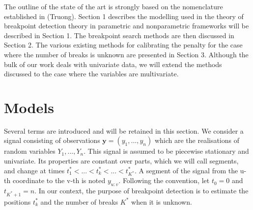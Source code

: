 The outline of the state of the art is strongly based on the nomenclature established in (Truong). Section 1 describes the modelling used in the theory of breakpoint detection theory in parametric and nonparametric frameworks will be described in Section 1. The breakpoint search methods are then discussed in Section 2. The various existing methods for calibrating the penalty for the case where the number of breaks is unknown are presented in Section 3. Although the bulk of our work deals with univariate data, we will extend the methods discussed to the case where the variables are multivariate.


\section{Models}\label{chp2:model}

Several terms are introduced and will be retained in this section. We consider a signal consisting of observations $\bm y = (y_1,...,y_n)$ which are the realisations of random variables $Y_1,...,Y_n$. This signal is assumed to be piecewise stationary and univariate. Its properties are constant over parts, which we will call segments, and change at times $t_1^* <... < t_k^* <... < t_{K^*}^*$. A segment of the signal from the u-th coordinate to the v-th is noted $y_{u:v}$. Following the convention, let $t_0 = 0$ and $t_{K^*+1} = n$. In our context, the purpose of breakpoint detection is to estimate the positions $t_k^*$ and the number of breaks $K^*$ when it is unknown. 

